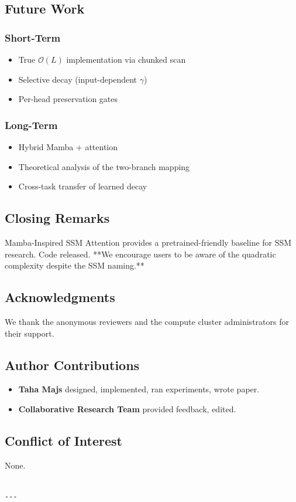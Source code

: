 \subsection{Future Work}

\subsubsection{Short-Term}
\begin{itemize}
\item True $\mathcal{O}(L)$ implementation via chunked scan
\item Selective decay (input-dependent $\gamma$)
\item Per-head preservation gates

\end{itemize}
\subsubsection{Long-Term}
\begin{itemize}
\item Hybrid Mamba + attention
\item Theoretical analysis of the two-branch mapping
\item Cross-task transfer of learned decay

\end{itemize}
\subsection{Closing Remarks}

Mamba-Inspired SSM Attention provides a pretrained-friendly baseline for 
SSM research. Code released. **We encourage users to be aware of the 
quadratic complexity despite the SSM naming.**

\subsection{Acknowledgments}

We thank the anonymous reviewers and the compute cluster administrators for their support.

\subsection{Author Contributions}

\begin{itemize}
\item \textbf{Taha Majs} designed, implemented, ran experiments, wrote paper.
\item \textbf{Collaborative Research Team} provided feedback, edited.

\end{itemize}
\subsection{Conflict of Interest}

None.
\begin{lstlisting}

---
\end{lstlisting}